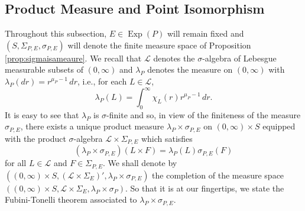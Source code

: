 \documentclass[11pt]{article}
\theoremstyle{remark}
\newcommand\Exp{\operatorname{Exp}}
\begin{document}
\subsection{Product Measure and Point Isomorphism}\label{subsec:ProductMeasure}

Throughout this subsection, $E\in\Exp(P)$ will remain fixed and $(S,\Sigma_{P,E},\sigma_{P,E})$ will denote the finite measure space of Proposition \ref{prop:sigmaisameaure}. We recall that $\mathcal{L}$ denotes the $\sigma$-algebra of Lebesgue measurable subsets of $(0,\infty)$ and  $\lambda_P$ denotes the measure on $(0,\infty)$ with $\lambda_P(dr)=r^{\mu_P-1}\,dr$, i.e., for each $L\in\mathcal{L}$,
\begin{equation*}
\lambda_P(L)=\int_0^\infty \chi_L(r)r^{\mu_P-1}\,dr.
\end{equation*}
It is easy to see that $\lambda_P$ is $\sigma$-finite and so, in view of the finiteness of the measure $\sigma_{P,E}$, there exists a unique product measure $\lambda_P\times\sigma_{P,E}$ on $(0,\infty)\times S$ equipped with the product $\sigma$-algebra $\mathcal{L}\times\Sigma_{P,E}$ which satisfies
\begin{equation*}
    (\lambda_P\times\sigma_{P,E})(L\times F)=\lambda_P(L)\sigma_{P,E}(F)
\end{equation*}
for all $L\in\mathcal{L}$ and $F\in\Sigma_{P,E}$. We shall denote by $((0,\infty)\times S,(\mathcal{L}\times\Sigma_E)',\lambda_P\times\sigma_{P,E})$ the completion of the measure space $((0,\infty)\times S,\mathcal{L}\times\Sigma_E,\lambda_P\times\sigma_P)$. So that it is at our fingertips, we state the Fubini-Tonelli theorem associated to $\lambda_P\times \sigma_{P,E}$.
\end{document}
